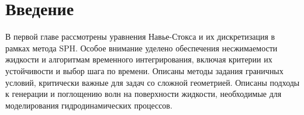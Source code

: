 \chapter*{Введение}                         %

\newcommand{\actuality}{}
\newcommand{\progress}{}
\newcommand{\aim}{{\text\aimTXT}}
\newcommand{\tasks}{\text{\tasksTXT}}
\newcommand{\novelty}{\text{\noveltyTXT}}
\newcommand{\influence}{\text{\influenceTXT}}
\newcommand{\methods}{\text{\methodsTXT}}
\newcommand{\defpositions}{\text{\defpositionsTXT}}
\newcommand{\reliability}{\text{\reliabilityTXT}}
\newcommand{\probation}{\text{\probationTXT}}
\newcommand{\contribution}{\text{\contributionTXT}}
\newcommand{\publications}{\text{\publicationsTXT}}


%

В первой главе рассмотрены уравнения Навье-Стокса и их дискретизация в рамках метода SPH.
%
Особое внимание уделено обеспечения несжимаемости жидкости и алгоритмам временного интегрирования,
включая критерии их устойчивости и выбор шага по времени.
%
Описаны методы задания граничных условий, критически важные для задач со сложной геометрией.
%
Описаны подходы к генерации и поглощению волн на поверхности жидкости, 
необходимые для моделирования гидродинамических процессов.


